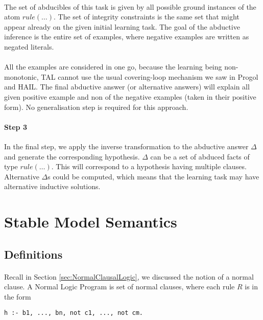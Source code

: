 \documentclass{article}
\theoremstyle{plain}
\theoremstyle{definition}
\begin{document}
\begin{multicols}{2}
\paragraph{} The set of abducibles of this task is given by all possible ground instances of the atom $rule(\dots)$. The set of integrity constraints is the same set that might appear already on the given initial  learning task. The goal of the abductive inference is the entire set of examples, where negative examples are written as negated literals.

\paragraph{} All the examples are considered in one go, because the learning being non-monotonic, TAL cannot use the usual covering-loop mechanism we saw in Progol and HAIL. The final abductive answer (or alternative answers) will explain all given positive example and non of the negative examples (taken in their positive form). No generalisation step is required for this approach.

\paragraph{Step 3} In the final step, we apply the inverse transformation to the abductive answer $\Delta$ and generate the corresponding hypothesis. $\Delta$ can be a set of abduced facts of type $rule(\dots)$. This will correspond to a hypothesis having multiple clauses. Alternative $\Delta$s could be computed, which means that the learning task may have alternative inductive solutions.

\section{Stable Model Semantics}

\subsection{Definitions}

\paragraph{} Recall in Section \ref{sec:NormalClausalLogic}, we discussed the notion of a normal clause. A Normal Logic Program is set of normal clauses, where each rule $R$ is in the form

\begin{lstlisting}
h :- b1, ..., bn, not c1, ..., not cm.
\end{lstlisting}


\end{multicols}
\end{document}
